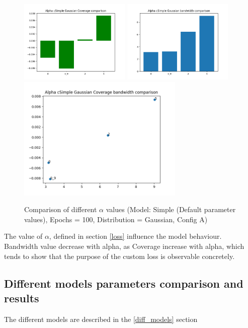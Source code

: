 \documentclass[a4paper, 12pt]{article}
\begin{document}
\begin{figure}[!h]
    \centering
    \includegraphics[width=200px]{plots/hist/a/alpha/cSimple/Gaussian/Coverage.png}
    \includegraphics[width=200px]{plots/hist/a/alpha/cSimple/Gaussian/bandwidth.png}
    \includegraphics[width=300px]{plots/scatter/a/alpha/cSimple/Gaussian/Coverage_bandwidth.png}
    \caption{Comparison of different $\alpha$ values (Model: Simple (Default parameter values), Epochs = 100, Distribution = Gaussian, Config A)}
    \label{fig:comp_alpha}
\end{figure}

The value of $\alpha$, defined in section \ref{loss} influence the model behaviour.
Bandwidth value decrease with alpha, as Coverage increase with alpha, which tends to show that the purpose of the custom loss is observable concretely.

\subsection{Different models parameters comparison and results}

The different models are described in the \ref{diff_models} section
\end{document}
